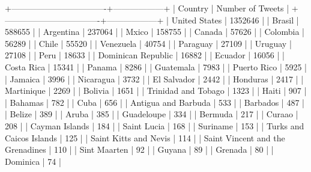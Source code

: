 +----------------------------------+------------------+
|             Country              | Number of Tweets |
+----------------------------------+------------------+
|          United States           |     1352646      |
|              Brasil              |      588655      |
|            Argentina             |      237064      |
|              Mxico               |      158755      |
|              Canada              |      57626       |
|             Colombia             |      56289       |
|              Chile               |      55520       |
|            Venezuela             |      40754       |
|             Paraguay             |      27109       |
|             Uruguay              |      27108       |
|               Peru               |      18633       |
|        Dominican Republic        |      16882       |
|             Ecuador              |      16056       |
|            Costa Rica            |      15341       |
|              Panama              |       8286       |
|            Guatemala             |       7983       |
|           Puerto Rico            |       5925       |
|             Jamaica              |       3996       |
|            Nicaragua             |       3732       |
|           El Salvador            |       2442       |
|             Honduras             |       2417       |
|            Martinique            |       2269       |
|             Bolivia              |       1651       |
|       Trinidad and Tobago        |       1323       |
|              Haiti               |       907        |
|             Bahamas              |       782        |
|               Cuba               |       656        |
|       Antigua and Barbuda        |       533        |
|             Barbados             |       487        |
|              Belize              |       389        |
|              Aruba               |       385        |
|            Guadeloupe            |       334        |
|             Bermuda              |       217        |
|              Curaao              |       208        |
|          Cayman Islands          |       184        |
|           Saint Lucia            |       168        |
|             Suriname             |       153        |
|     Turks and Caicos Islands     |       125        |
|      Saint Kitts and Nevis       |       114        |
| Saint Vincent and the Grenadines |       110        |
|           Sint Maarten           |        92        |
|              Guyana              |        89        |
|             Grenada              |        80        |
|             Dominica             |        74        |
